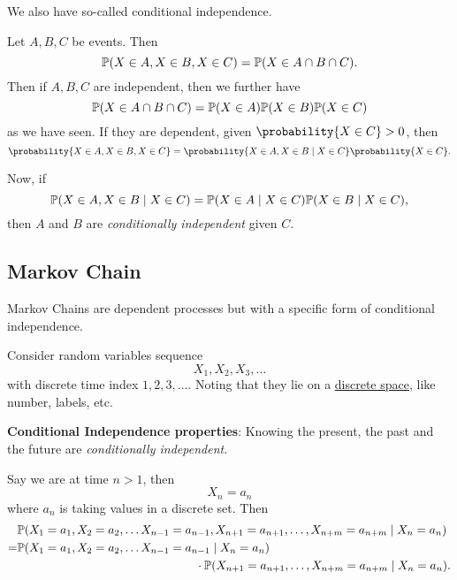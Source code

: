 We also have so-called conditional independence.
\begin{definition}
	Let \(A, B, C\) be events. Then
	\[
		\mathbb{\MakeUppercase{P}}(X\in A, X\in B, X\in C) = \mathbb{\MakeUppercase{P}}(X\in A\cap B\cap C).
	\]
	Then if \(A, B,  C\) are independent, then we further have
	\[
		\mathbb{\MakeUppercase{P}}(X\in A\cap B\cap C)= \mathbb{\MakeUppercase{P}}(X\in A)\mathbb{\MakeUppercase{P}}(X\in B)\mathbb{\MakeUppercase{P}}(X\in C)
	\]
	as we have seen. If they are dependent, given \(\probability{X\in C}>0\), then
	\[
		\probability{X\in A, X\in B, X\in C} = \probability{X\in A, X\in B \mid X\in C}\probability{X\in C}.
	\]

	Now, if
	\[
		\mathbb{\MakeUppercase{P}}(X\in A, X\in B \mid X\in C) = \mathbb{\MakeUppercase{P}}(X\in A \mid X\in C)\mathbb{\MakeUppercase{P}}(X\in B \mid X\in C),
	\]
	then \(A\) and \(B\) are \emph{conditionally independent} given \(C\).
\end{definition}

\subsection{Markov Chain}
Markov Chains are dependent processes but with a specific form of conditional independence.

Consider random variables sequence
\[
	X_1, X_2, X_3, \ldots
\]
with discrete time index \(1, 2, 3, \ldots \). Noting that they lie on a \underline{discrete space}, like number, labels, etc.

\begin{note}
	\textbf{Conditional Independence properties}: Knowing the present, the past and the future are \emph{conditionally independent}.
\end{note}

Say we are at time \(n>1\), then
\[
	X_n = a_n
\]
where \(a_n\) is taking values in a discrete set. Then
	{\small
		\[
			\begin{split}
				&\mathbb{\MakeUppercase{P}}(X_1 = a_1, X_2 = a_2,  \ldots X_{n-1} = a_{n-1}, X_{n+1} = a_{n+1},\ldots , X_{n+m} = a_{n+m}  \mid X_n = a_n )\\
				=&\mathbb{\MakeUppercase{P}}(X_1 = a_1, X_2 = a_2,  \ldots X_{n-1} = a_{n-1}\mid X_n = a_n )\\
				&\qquad\qquad\qquad\qquad\qquad\qquad\qquad\quad\cdot \mathbb{\MakeUppercase{P}}( X_{n+1} = a_{n+1},\ldots , X_{n+m} = a_{n+m}  \mid X_n = a_n ).
			\end{split}
		\]
	}

